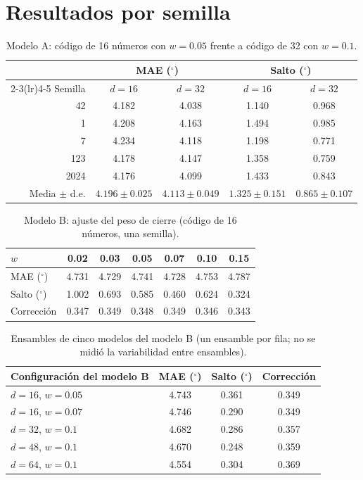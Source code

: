 \documentclass[11pt,a4paper]{amsart}
\newcommand{\gr}{$^{\circ}$}
\begin{document}
\section{Resultados por semilla}
\label{app:semillas}

\begin{table}[h]
\centering\small
\begin{tabular}{rcccc}
\toprule
 & \multicolumn{2}{c}{MAE (\gr)} & \multicolumn{2}{c}{Salto (\gr)} \\
\cmidrule(lr){2-3}\cmidrule(lr){4-5}
Semilla & $d=16$ & $d=32$ & $d=16$ & $d=32$ \\
\midrule
42 & 4.182 & 4.038 & 1.140 & 0.968 \\
1 & 4.208 & 4.163 & 1.494 & 0.985 \\
7 & 4.234 & 4.118 & 1.198 & 0.771 \\
123 & 4.178 & 4.147 & 1.358 & 0.759 \\
2024 & 4.176 & 4.099 & 1.433 & 0.843 \\
\midrule
Media $\pm$ d.e. & $4.196\pm0.025$ & $4.113\pm0.049$ & $1.325\pm0.151$ & $0.865\pm0.107$ \\
\bottomrule
\end{tabular}
\caption{Modelo A: código de 16 números con $w=0.05$ frente a código de 32 con $w=0.1$.}
\end{table}

\begin{table}[h]
\centering\small
\begin{tabular}{lcccccc}
\toprule
$w$ & 0.02 & 0.03 & 0.05 & 0.07 & 0.10 & 0.15 \\
\midrule
MAE (\gr) & 4.731 & 4.729 & 4.741 & 4.728 & 4.753 & 4.787 \\
Salto (\gr) & 1.002 & 0.693 & 0.585 & 0.460 & 0.624 & 0.324 \\
Corrección & 0.347 & 0.349 & 0.348 & 0.349 & 0.346 & 0.343 \\
\bottomrule
\end{tabular}
\caption{Modelo B: ajuste del peso de cierre (código de 16 números, una semilla).}
\end{table}

\begin{table}[h]
\centering\small
\begin{tabular}{lccc}
\toprule
Configuración del modelo B & MAE (\gr) & Salto (\gr) & Corrección \\
\midrule
$d=16$, $w=0.05$ & 4.743 & 0.361 & 0.349 \\
$d=16$, $w=0.07$ & 4.746 & 0.290 & 0.349 \\
$d=32$, $w=0.1$ & 4.682 & 0.286 & 0.357 \\
$d=48$, $w=0.1$ & 4.670 & 0.248 & 0.359 \\
$d=64$, $w=0.1$ & 4.554 & 0.304 & 0.369 \\
\bottomrule
\end{tabular}
\caption{Ensambles de cinco modelos del modelo B (un ensamble por fila; no se midió la variabilidad entre ensambles).}
\end{table}
\end{document}
